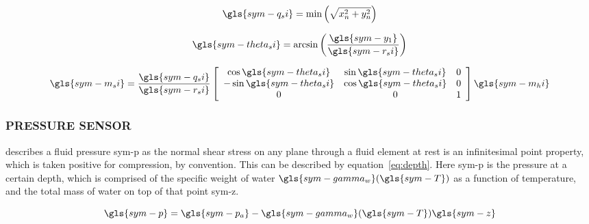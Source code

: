 \begin{equation}
    \label{eq:ellipse_min}
    \gls{sym-q_si} = \min \left(\sqrt{x_n^2 + y_n^2}\right)
\end{equation}

\begin{equation}
    \label{eq:theta_ellipse}
    \gls{sym-theta_si} = \arcsin\left(\frac{\gls{sym-y_1}}{\gls{sym-r_si}}\right)
\end{equation}

\begin{equation}
    \label{eq:correct heading}
    \gls{sym-m_si} = \frac{\gls{sym-q_si}}{\gls{sym-r_si}} \left[\begin{array}{ccc}
                                                                     \cos \gls{sym-theta_si} & \sin
                                                                     \gls{sym-theta_si} & 0 \\
                                                                     -\sin \gls{sym-theta_si} & \cos
                                                                     \gls{sym-theta_si} & 0 \\
                                                                     0 & 0
                                                                     & 1
    \end{array}\right] \gls{sym-m_hi}
\end{equation}

\subsubsection{PRESSURE SENSOR}\label{sec:pressure sensor}

\citet{white_fluid_2011} describes a fluid pressure \gls{sym-p} as the normal shear stress on any plane through a 
fluid element at rest is an infinitesimal point property, which is taken positive for compression, by convention. 
This can be described by equation~\ref{eq:depth}. Here \gls{sym-p} is the pressure at a certain depth, which is 
comprised of the specific weight of water \( \gls{sym-gamma_w}(\gls{sym-T}) \) as a function of temperature, and the 
total mass of water on top of that point \gls{sym-z}.

\begin{equation}
    \label{eq:depth}
    \gls{sym-p} = \gls{sym-p_a} - \gls{sym-gamma_w}(\gls{sym-T}) \gls{sym-z}
\end{equation}

